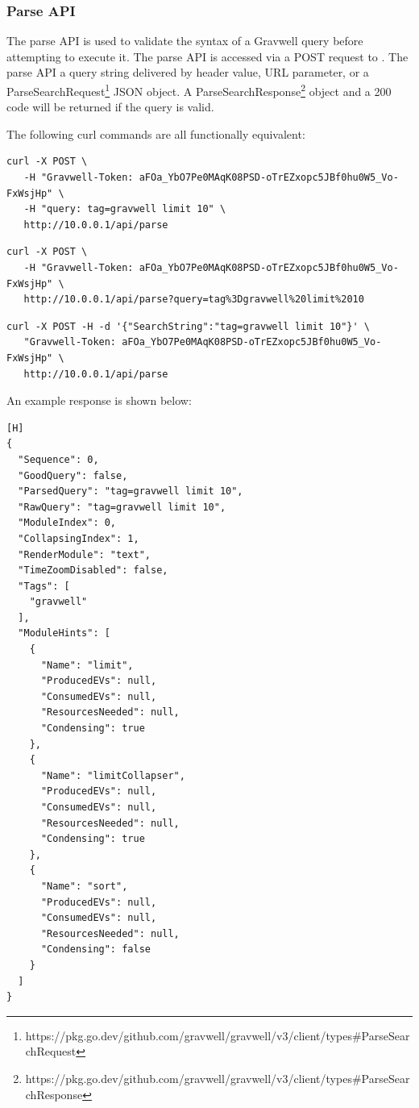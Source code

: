 \subsubsection{Parse API}

The parse API is used to validate the syntax of a Gravwell query before attempting to execute it. The parse API is accessed via a POST request to .  The parse API a query string delivered by header value, URL parameter, or a ParseSearchRequest\footnote{https://pkg.go.dev/github.com/gravwell/gravwell/v3/client/types\#ParseSearchRequest} JSON object.  A ParseSearchResponse\footnote{https://pkg.go.dev/github.com/gravwell/gravwell/v3/client/types\#ParseSearchResponse} object and a 200 code will be returned if the query is valid.

The following curl commands are all functionally equivalent:

\begin{verbatim}
curl -X POST \
   -H "Gravwell-Token: aFOa_YbO7Pe0MAqK08PSD-oTrEZxopc5JBf0hu0W5_Vo-FxWsjHp" \
   -H "query: tag=gravwell limit 10" \
   http://10.0.0.1/api/parse
\end{verbatim}

\begin{verbatim}
curl -X POST \
   -H "Gravwell-Token: aFOa_YbO7Pe0MAqK08PSD-oTrEZxopc5JBf0hu0W5_Vo-FxWsjHp" \
   http://10.0.0.1/api/parse?query=tag%3Dgravwell%20limit%2010
\end{verbatim}

\begin{verbatim}
curl -X POST -H -d '{"SearchString":"tag=gravwell limit 10"}' \
   "Gravwell-Token: aFOa_YbO7Pe0MAqK08PSD-oTrEZxopc5JBf0hu0W5_Vo-FxWsjHp" \
   http://10.0.0.1/api/parse
\end{verbatim}

An example response is shown below:

\begin{verbatim}[H]
{
  "Sequence": 0,
  "GoodQuery": false,
  "ParsedQuery": "tag=gravwell limit 10",
  "RawQuery": "tag=gravwell limit 10",
  "ModuleIndex": 0,
  "CollapsingIndex": 1,
  "RenderModule": "text",
  "TimeZoomDisabled": false,
  "Tags": [
    "gravwell"
  ],
  "ModuleHints": [
    {
      "Name": "limit",
      "ProducedEVs": null,
      "ConsumedEVs": null,
      "ResourcesNeeded": null,
      "Condensing": true
    },
    {
      "Name": "limitCollapser",
      "ProducedEVs": null,
      "ConsumedEVs": null,
      "ResourcesNeeded": null,
      "Condensing": true
    },
    {
      "Name": "sort",
      "ProducedEVs": null,
      "ConsumedEVs": null,
      "ResourcesNeeded": null,
      "Condensing": false
    }
  ]
}
\end{verbatim}

